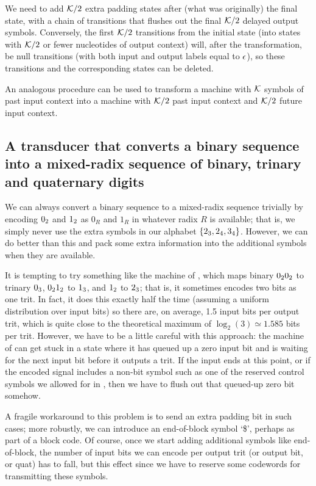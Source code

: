\documentclass[english]{article}
\begin{document}
We need to add ${\cal K}/2$ extra padding states after (what was originally) the final state,
with a chain of transitions that flushes out the final ${\cal K}/2$ delayed output symbols.
Conversely, the first ${\cal K}/2$ transitions from the initial state
(into states with ${\cal K}/2$ or fewer nucleotides of output context)
will, after the transformation,
be null transitions (with both input and output labels equal to $\epsilon$),
so these transitions and the corresponding states can be deleted.

An analogous procedure can be used to transform a machine with ${\cal K}$ symbols of past input context
into a machine with ${\cal K}/2$ past input context and ${\cal K}/2$ future input context.

\subsection{A transducer that converts a binary sequence into a mixed-radix sequence of binary, trinary and quaternary digits}

We can always convert a binary sequence to a mixed-radix sequence trivially by encoding
$0_2$ and $1_2$ as $0_R$ and $1_R$ in whatever radix $R$ is available;
that is, we simply never use the extra symbols in our alphabet $\{ 2_3, 2_4, 3_4 \}$.
However, we can do better than this and pack some extra information into the additional symbols when they are available.

It is tempting to try something like the machine of ,
which maps binary $0_20_2$ to trinary $0_3$,
$0_21_2$ to $1_3$,
and $1_2$ to $2_3$;
that is, it sometimes encodes two bits as one trit.
In fact, it does this exactly half the time (assuming a uniform distribution over input bits)
so there are, on average, 1.5 input bits per output trit,
which is quite close to the theoretical maximum of $\log_2(3) \simeq 1.585$ bits per trit.
However, we have to be a little careful with this approach:
the machine of  can get stuck in a state where it has queued up a zero input bit
and is waiting for the next input bit before it outputs a trit.
If the input ends at this point, or if the encoded signal includes a non-bit symbol
such as one of the reserved control symbols we allowed for in ,
then we have to flush out that queued-up zero bit somehow.

A fragile workaround to this problem is to send an extra padding bit in such cases;
more robustly, we can introduce an end-of-block symbol `\$',
perhaps as part of a block code.
Of course, once we start adding additional symbols like end-of-block, the number of input bits we can encode per output trit (or output bit, or quat) has to fall,
but this effect 
since we have to reserve some codewords for transmitting these symbols.
\end{document}
